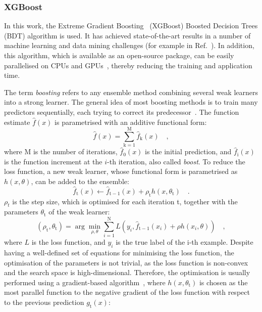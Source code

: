 \subsubsection{XGBoost}
In this work, the Extreme Gradient Boosting~\cite{DBLP:xgboost} (XGBoost) Boosted Decision Trees (BDT) algorithm is used. It has achieved state-of-the-art results in a number of machine learning and data mining challenges (for example in Ref.~\cite{kaggle:higgs}). In addition, this algorithm, which is available as an open-source package, can be easily parallelised on CPUs and GPUs~\cite{mitchell2017accelerating}, thereby reducing the training and application time.

The term \emph{boosting} refers to any ensemble method combining several weak learners into a strong learner. The general idea of most boosting methods is to train many predictors sequentially, each trying to correct its predecessor~\cite{geron2022hands}. The function estimate $\widehat{f}(x)$ is parametrised with an additive functional form:
\begin{equation*}
    \widehat{f}(x) = \sum_{\mathrm{k}=1}^{\mathrm{M}} \widehat{f}_\mathrm{k}(x)\quad ,
\end{equation*}
where M is the number of iterations, $\widehat{f}_\mathrm{0}(x)$ is the initial prediction, and $\widehat{f}_\mathrm{i}(x)$ is the function increment at the $i$-th iteration, also called \emph{boost}. To reduce the loss function, a new weak learner, whose functional form is parametrised as $h(x,\theta)$, can be added to the ensemble:
\begin{equation*}
    \widehat{f}_\mathrm{t}(x) \leftarrow \widehat{f}_{\mathrm{t}-1}(x) + \rho_\mathrm{t} h(x,\theta_\mathrm{t})\quad .
\end{equation*}
$\rho_t$ is the step size, which is optimised for each iteration t, together with the parameters $\theta_\mathrm{t}$ of the weak learner:
\begin{equation*}
    (\rho_\mathrm{t}, \theta_\mathrm{t}) = \arg\min_{\rho,\theta} \sum_{{i}=1}^{\mathrm{N}} L\left(y_i, \widehat{f}_{\mathrm{t}-1}(x_i) + \rho h(x_i,\theta)\right)\quad ,
\end{equation*}
where $L$ is the loss function, and $y_i$ is the true label of the i-th example. Despite having a well-defined set of equations for minimising the loss function, the optimisation of the parameters is not trivial, as the loss function is non-convex and the search space is high-dimensional. Therefore, the optimisation is usually performed using a gradient-based algorithm~\cite{friedman2001greedy,natekin2013gradient}, where $h(x,\theta_\mathrm{t})$ is chosen as the most parallel function to the negative gradient of the loss function with respect to the previous prediction $g_\mathrm{t}(x)$:
